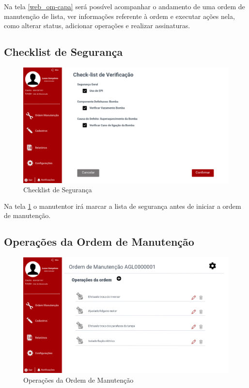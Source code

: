 Na tela \ref{web_om-capa} será possível acompanhar o andamento de uma ordem de manutenção de lista, ver informações referente à ordem e executar ações nela, como alterar status, adicionar operações e realizar assinaturas.

\newpage
\subsection{Checklist de Segurança}

\begin{figure}[htb]
	\caption{\label{web_check-list}Checklist de Segurança}
	\begin{center}
		\includegraphics[scale=0.40]{./Figuras/web/check-list.png}
	\end{center}
\end{figure}

Na tela \ref{web_check-list} o manutentor irá marcar a lista de segurança antes de iniciar a ordem de manutenção.

\newpage
\subsection{Operações da Ordem de Manutenção}

\begin{figure}[htb]
	\caption{\label{web_om-operacoes}Operações da Ordem de Manutenção}
	\begin{center}
		\includegraphics[scale=0.40]{./Figuras/web/om-operacoes.png}
	\end{center}
\end{figure}

